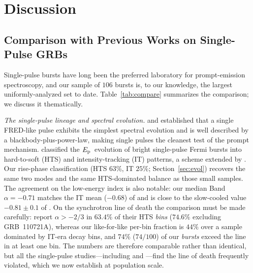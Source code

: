 \documentclass[twocolumn]{aastex631}
\newcommand{\Ep}{\ensuremath{E_{\rm p}}}
\begin{document}
\section{Discussion} \label{sec:discussion}
\subsection{Comparison with Previous Works on Single-Pulse GRBs}
\label{sec:disc-compare}
Single-pulse bursts have long been the preferred laboratory for prompt-emission
spectroscopy, and our sample of $106$ bursts is, to our knowledge, the largest
uniformly-analyzed set to date. Table~\ref{tab:compare} summarizes the
comparison; we discuss it thematically.

\emph{The single-pulse lineage and spectral evolution.}
\citet{Ryde2004} and \citet{RydePeer2009} established that a single FRED-like
pulse exhibits the simplest spectral evolution and is well described by a
blackbody-plus-power-law, making single pulses the cleanest test of the prompt
mechanism. \citet{Lu2012} classified the \Ep\ evolution of bright single-pulse
Fermi bursts into hard-to-soft (HTS) and intensity-tracking (IT) patterns, a
scheme extended by \citet{Basak2013,Basak2014}. Our rise-phase classification
(HTS $63\%$, IT $25\%$; Section~\ref{sec:evol}) recovers the same two modes and
the same HTS-dominated balance as those small samples. The agreement on the
low-energy index is also notable: our median Band $\alpha=-0.71$ matches the IT
mean ($-0.68$) of \citet{Basak2014} and is close to the slow-cooled value
$-0.81\pm0.1$ of \citet{Burgess2014b}. On the synchrotron line of death the
comparison must be made carefully: \citet{Basak2014} report $\alpha>-2/3$ in
$63.4\%$ of their HTS \emph{bins} ($74.6\%$ excluding GRB~110721A), whereas our
like-for-like per-bin fraction is $44\%$ over a sample dominated by IT-era
decay bins, and $74\%$ ($74/100$) of our \emph{bursts} exceed the line in at
least one bin. The numbers are therefore comparable rather than identical, but
all the single-pulse studies---including \citet{Basak2013} and
\citet{Guiriec2010}---find the line of death frequently violated, which we now
establish at population scale.
\end{document}

